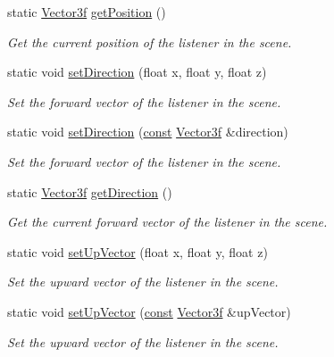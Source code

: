 \begin{DoxyCompactItemize}
static \hyperlink{namespacesf_a36e44d9e6d8f649703698ec9d24ac052}{Vector3f} \hyperlink{classsf_1_1_listener_acd7ee65bc948ca38e1c669aa12340c54}{get\-Position} ()
\begin{DoxyCompactList}\small\item\em Get the current position of the listener in the scene. \end{DoxyCompactList}\item 
static void \hyperlink{classsf_1_1_listener_ae479dc15513c6557984d26e32d06d06e}{set\-Direction} (float x, float y, float z)
\begin{DoxyCompactList}\small\item\em Set the forward vector of the listener in the scene. \end{DoxyCompactList}\item 
static void \hyperlink{classsf_1_1_listener_a1d99d9457c6ddad93449ecb4f504c2bf}{set\-Direction} (\hyperlink{term__entry_8h_a57bd63ce7f9a353488880e3de6692d5a}{const} \hyperlink{namespacesf_a36e44d9e6d8f649703698ec9d24ac052}{Vector3f} \&direction)
\begin{DoxyCompactList}\small\item\em Set the forward vector of the listener in the scene. \end{DoxyCompactList}\item 
static \hyperlink{namespacesf_a36e44d9e6d8f649703698ec9d24ac052}{Vector3f} \hyperlink{classsf_1_1_listener_a54e91baba51d4431474f53ff7f9309f9}{get\-Direction} ()
\begin{DoxyCompactList}\small\item\em Get the current forward vector of the listener in the scene. \end{DoxyCompactList}\item 
static void \hyperlink{classsf_1_1_listener_a0ea9b3083a994b2b90253543bc4e3ad6}{set\-Up\-Vector} (float x, float y, float z)
\begin{DoxyCompactList}\small\item\em Set the upward vector of the listener in the scene. \end{DoxyCompactList}\item 
static void \hyperlink{classsf_1_1_listener_a281e8cd44d3411d891b5e83b0cb6b9d4}{set\-Up\-Vector} (\hyperlink{term__entry_8h_a57bd63ce7f9a353488880e3de6692d5a}{const} \hyperlink{namespacesf_a36e44d9e6d8f649703698ec9d24ac052}{Vector3f} \&up\-Vector)
\begin{DoxyCompactList}\small\item\em Set the upward vector of the listener in the scene. \end{DoxyCompactList}\item 

\end{DoxyCompactItemize}
